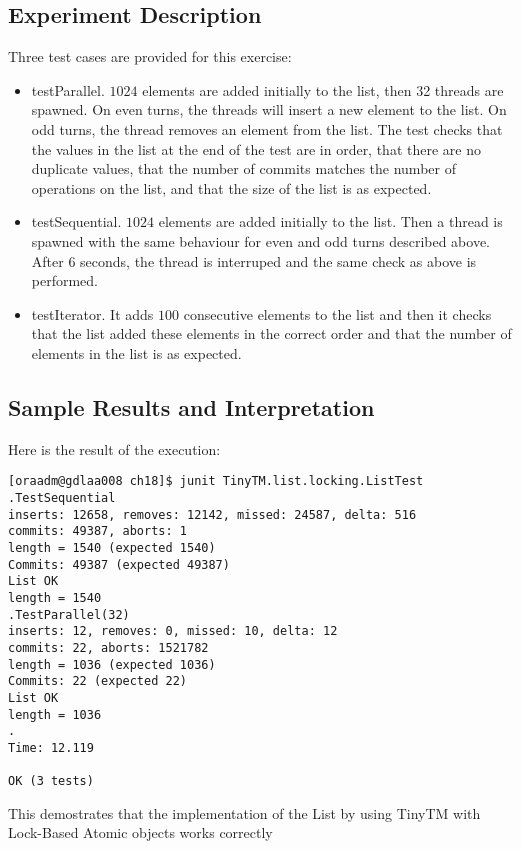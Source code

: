 \subsection{Experiment Description}
\par
Three test cases are provided for this exercise:
\begin{itemize}
\item testParallel. $1024$ elements are added initially to the list, then 32
threads are spawned. On even turns, the threads will insert a new element to the
list. On odd turns, the thread removes an element from the list. The test checks
that the values in the list at the end of the test are in order, that there are
no duplicate values, that the number of commits matches the number of operations
on the list, and that the size of the list is as expected.
\item testSequential. $1024$ elements are added initially to the list. Then a
thread is spawned with the same behaviour for even and odd turns described
above. After $6$ seconds, the thread is interruped and the same check as above
is performed.
\item testIterator. It adds $100$ consecutive elements to the list and then it
checks that the list added these elements in the correct order and that the
number of elements in the list is as expected.
\end{itemize}
\par
\subsection{Sample Results and Interpretation}
\par
Here is the result of the execution:
\par
\hfill
\begin{verbatim}
[oraadm@gdlaa008 ch18]$ junit TinyTM.list.locking.ListTest
.TestSequential
inserts: 12658, removes: 12142, missed: 24587, delta: 516
commits: 49387, aborts: 1
length = 1540 (expected 1540)
Commits: 49387 (expected 49387)
List OK
length = 1540
.TestParallel(32)
inserts: 12, removes: 0, missed: 10, delta: 12
commits: 22, aborts: 1521782
length = 1036 (expected 1036)
Commits: 22 (expected 22)
List OK
length = 1036
.
Time: 12.119

OK (3 tests)
\end{verbatim}
\hfill
\par
This demostrates that the implementation of the List by using TinyTM with
Lock-Based Atomic objects works correctly
\par
